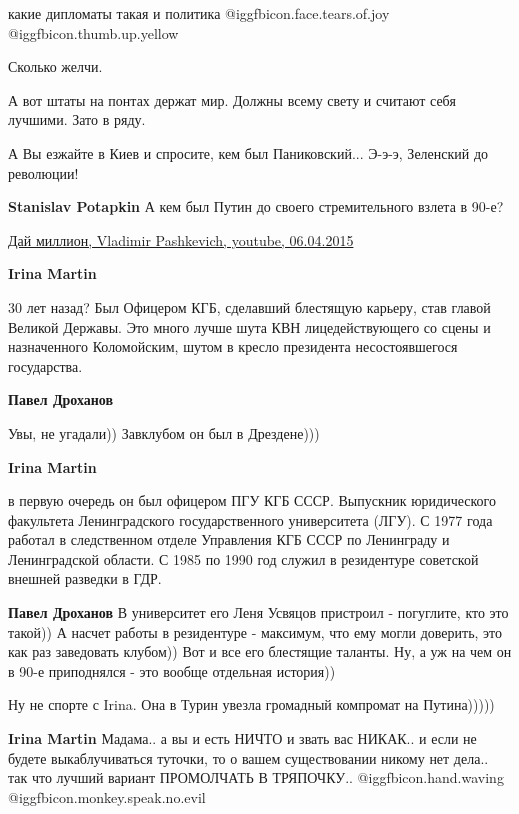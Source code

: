 \begin{itemize}
какие дипломаты такая и политика @igg{fbicon.face.tears.of.joy}  @igg{fbicon.thumb.up.yellow} 

Сколько желчи.

А вот штаты на понтах держат мир. Должны всему свету и считают себя лучшими. Зато в ряду.

А Вы езжайте в Киев и спросите, кем был Паниковский... Э-э-э, Зеленский до революции!

\begin{itemize} %
\textbf{Stanislav Potapkin} А кем был Путин до своего стремительного взлета в 90-е?


\href{https://www.youtube.com/watch?v=Ao_fusFlucg}{%
Дай миллион, Vladimir Pashkevich, youtube, 06.04.2015%
}

\textbf{Irina Martin} 

30 лет назад? Был Офицером КГБ, сделавший блестящую карьеру, став главой
Великой Державы. Это много лучше шута КВН лицедействующего со сцены и
назначенного Коломойским, шутом в кресло президента несостоявшегося
государства.

\textbf{Павел Дроханов} 

Увы, не угадали)) Завклубом он был в Дрездене)))

\textbf{Irina Martin} 

в первую очередь он был офицером ПГУ КГБ СССР. Выпускник юридического
факультета Ленинградского государственного университета (ЛГУ). С 1977 года
работал в следственном отделе Управления КГБ СССР по Ленинграду и Ленинградской
области. С 1985 по 1990 год служил в резидентуре советской внешней разведки в
ГДР.

\textbf{Павел Дроханов} В университет его Леня Усвяцов пристроил - погуглите, кто это такой)) А насчет работы в резидентуре - максимум, что ему могли доверить, это как раз заведовать клубом)) Вот и все его блестящие таланты. Ну, а уж на чем он в 90-е приподнялся - это вообще отдельная история))

Ну не спорте с Irina. Она в Турин увезла громадный компромат на Путина)))))

\textbf{Irina Martin}
Мадама.. а вы и есть НИЧТО и звать вас НИКАК.. и если не будете выкаблучиваться туточки, то о вашем существовании никому нет дела.. так что лучший вариант ПРОМОЛЧАТЬ В ТРЯПОЧКУ.. @igg{fbicon.hand.waving}  @igg{fbicon.monkey.speak.no.evil} 


\end{itemize}
\end{itemize}
